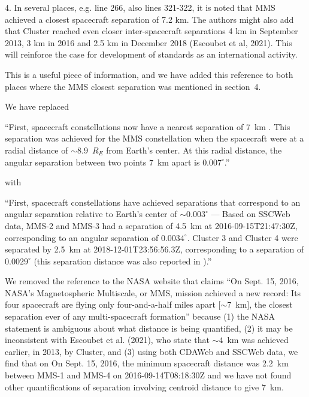 \documentclass[11pt]{article}
\begin{document}
4. In several places, e.g. line 266, also lines 321-322, it is noted that MMS achieved a closest spacecraft separation of 7.2 km. The authors might also add that Cluster reached even closer inter-spacecraft separations 4 km in September 2013, 3 km in 2016 and 2.5 km in December 2018 (Escoubet et al, 2021). This will reinforce the case for development of standards as an international activity.
\\
{\color{violet}
\begin{leftbar}
This is a useful piece of information, and we have added this reference to both places where the MMS closest separation was mentioned in section~4.

We have replaced 

``First, spacecraft constellations now have a nearest separation of 7~km \mbox{\cite{NASA2016}}. This separation was achieved for the MMS constellation when the spacecraft were at a radial distance of ${\sim}8.9$~$R_E$ from Earth's center. At this radial distance, the angular separation between two points 7~km apart is $0.007^\circ$.''

with

``First, spacecraft constellations have achieved separations that correspond to an angular separation relative to Earth's center of ${\sim} 0.003^\circ$ --- Based on SSCWeb data, MMS-2 and MMS-3 had a separation of 4.5~km at 2016-09-15T21:47:30Z, corresponding to an angular separation of $0.0034^\circ$. Cluster 3 and Cluster 4 were separated by 2.5~km at 2018-12-01T23:56:56.3Z, corresponding to a separation of $0.0029^\circ$ (this separation distance was also reported in \cite{Escoubet2021}).''

We removed the reference to the NASA website that claims ``On Sept. 15, 2016, NASA’s Magnetospheric Multiscale, or MMS, mission achieved a new record: Its four spacecraft are flying only four-and-a-half miles apart [${\sim}7$~km], the closest separation ever of any multi-spacecraft formation'' because (1) the NASA statement is ambiguous about what distance is being quantified, (2) it may be inconsistent with Escoubet et al. (2021), who state that ${\sim}4$~km was achieved earlier, in 2013, by Cluster, and (3) using both CDAWeb and SSCWeb data, we find that on On Sept. 15, 2016, the minimum spacecraft distance was 2.2~km between MMS-1 and MMS-4 on 2016-09-14T08:18:30Z and we have not found other quantifications of separation involving centroid distance to give 7~km.


\end{leftbar}}
\end{document}
